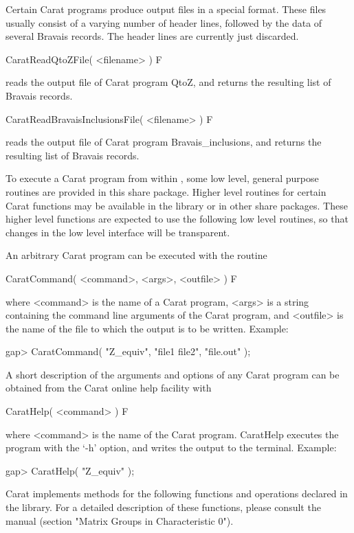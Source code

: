 Certain Carat programs produce output files in a special format.
These files usually consist of a varying number of header lines, 
followed by the data of several Bravais records. The header lines 
are currently just discarded.

\>CaratReadQtoZFile( <filename> ) F

reads the output file of Carat program QtoZ, and returns the
resulting list of Bravais records. 

\>CaratReadBravaisInclusionsFile( <filename> ) F

reads the output file of Carat program Bravais\_inclusions, 
and returns the resulting list of Bravais records. 



To execute a Carat program from within {\GAP}, some low level,
general purpose routines are provided in this share package. 
Higher level routines for certain Carat functions may be available 
in the {\GAP} library or in other share packages. These higher
level functions are expected to use the following low level routines,
so that changes in the low level interface will be transparent. 

An arbitrary Carat program can be executed with the routine

\>CaratCommand( <command>, <args>, <outfile> ) F

where <command> is the name of a Carat program, <args> is a string
containing the command line arguments of the Carat program,
and <outfile> is the name of the file to which the output is to be 
written. Example:

\beginexample
    gap> CaratCommand( "Z_equiv", "file1 file2", "file.out" );
\endexample

A short description of the arguments and options of any Carat 
program can be obtained from the Carat online help facility with

\>CaratHelp( <command> ) F

where <command> is the name of the Carat program. CaratHelp executes
the program with the `-h' option, and writes the output to the 
terminal. Example:

\beginexample
    gap> CaratHelp( "Z_equiv" );
\endexample


Carat implements methods for the following functions and operations
declared in the {\GAP} library. For a detailed description of these
functions, please consult the {\GAP} manual (section "Matrix Groups
in Characteristic 0").

